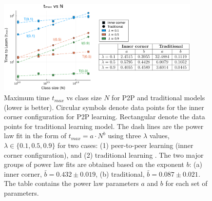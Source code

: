 \documentclass[10pt,a4paper,twoside]{article}
\begin{document}
\begin{figure}[h]
  \centering
  \includegraphics[width=0.9\textwidth]{figures/picture3}
  \caption{Maximum time $t_{max}$ vs class size $N$ for P2P and traditional models (lower is better). Circular symbols denote data points for the inner corner configuration for P2P learning. Rectangular denote the data points for traditional learning model. The dash lines are the power law fit in the form of $t_{max}=a \cdot N^b$ using three $\lambda$ values, $\lambda \in \lbrace 0.1, 0.5, 0.9 \rbrace$ for two cases: (1) peer-to-peer learning (inner corner configuration), and (2) traditional learning . The two major groups of power law fits are obtained based on the exponent $b$: (a) inner corner, $\bar{b} = 0.432 \pm 0.019$, (b) traditional, $\bar{b}=0.087\pm0.021$. The table contains the power law parameters $a$ and $b$ for each set of parameters.
  }
  \label{fig:tmax vs N}
\end{figure}

  
\end{document}
